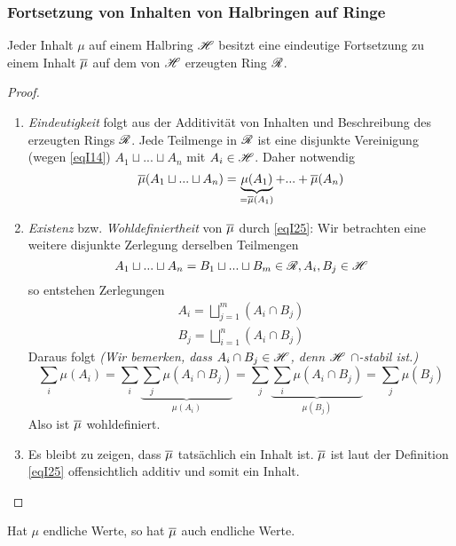 \subsubsection{Fortsetzung von Inhalten von Halbringen auf Ringe}
\begin{satz}
\begin{mdframed}
Jeder Inhalt $\mu$ auf einem Halbring $\mathscr{H}$ besitzt eine eindeutige Fortsetzung zu einem Inhalt $\overline{\mu}$ auf dem von $\mathscr{H}$ erzeugten Ring $\mathscr{R}$.
\end{mdframed}
\begin{proof} \
\begin{enumerate}[-,topsep=5pt, itemsep = 0 pt]
	\item \emph{Eindeutigkeit} folgt aus der Additivität von Inhalten und Beschreibung des erzeugten Rings $\mathscr{R}$. Jede Teilmenge in $\mathscr{R}$ ist eine disjunkte Vereinigung (wegen \eqref{eqI14}) $A_1 \sqcup ... \sqcup A_n$ mit $A_i \in \mathscr{H}$. Daher notwendig
	\begin{equation} \label{eqI25}
	\overline{\mu} (A_1 \sqcup ... \sqcup A_n) = \underbrace{\mu (A_1)}_{= \overline\mu(A_1)} + ... + \overline\mu (A_n)
	\end{equation}
	\item \emph{Existenz} bzw. \emph{Wohldefiniertheit} von $\overline\mu$ durch \eqref{eqI25}: Wir betrachten eine weitere disjunkte Zerlegung derselben Teilmengen
	\begin{equation*}
	A_1 \sqcup ... \sqcup A_n = B_1 \sqcup ... \sqcup B_m \in \mathscr{R}, A_i, B_j \in \mathscr{H}
	\end{equation*}
	so entstehen Zerlegungen 
	\begin{align*}
		A_i = \bigsqcup_{j=1}^m (A_i \cap B_j)	\\
		B_j = \bigsqcup_{i=1}^n (A_i \cap B_j)
	\end{align*}
	Daraus folgt \emph{(Wir bemerken, dass $A_i \cap B_j \in \mathscr{H}$, denn $\mathscr{H}$ $\cap$-stabil ist.)}
	\begin{equation*}
	\sum_i \mu (A_i ) = \sum_i \underbrace{\sum_j \mu (A_i \cap B_j)}_{\mu (A_i)}
	= \sum_j \underbrace{\sum_i \mu (A_i \cap B_j)}_{\mu (B_j)} = \sum_j \mu (B_j)
	\end{equation*}
	Also ist $\overline\mu$ wohldefiniert.
	\item Es bleibt zu zeigen, dass $\overline\mu$ tatsächlich ein Inhalt ist. $\overline\mu$ ist laut der Definition \eqref{eqI25} offensichtlich additiv und somit ein Inhalt.
\end{enumerate}
\end{proof}
\begin{remark}
Hat $\mu$ endliche Werte, so hat $\overline\mu$ auch endliche Werte.
\end{remark}
\end{satz}

